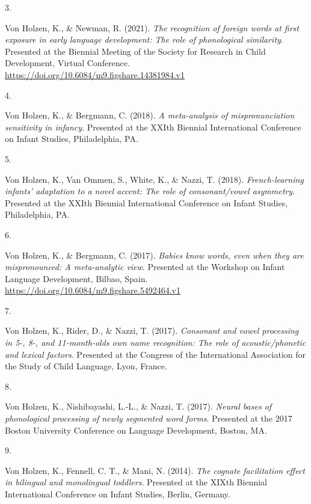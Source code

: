\documentclass[10pt,a4paper,]{article}
\newlength{\cslhangindent}
\newlength{\csllabelwidth}
\newcommand{\CSLLeftMargin}[1]{\parbox[t]{\csllabelwidth}{\hfill #1~}}
\newcommand{\CSLRightInline}[1]{\parbox[t]{\linewidth - \cslhangindent - \csllabelwidth}{#1}\vspace{0.8ex}}
\begin{document}
\leavevmode{}%
\CSLLeftMargin{3. }%
\CSLRightInline{Von Holzen, K., \& Newman, R. (2021). \emph{The
recognition of foreign words at first exposure in early language
development: The role of phonological similarity}. Presented at the
Biennial Meeting of the Society for Research in Child Development,
Virtual Conference.
\url{https://doi.org/10.6084/m9.figshare.14381984.v1}}

\leavevmode{}%
\CSLLeftMargin{4. }%
\CSLRightInline{Von Holzen, K., \& Bergmann, C. (2018). \emph{A
meta-analysis of mispronunciation sensitivity in infancy}. Presented at
the XXIth Biennial International Conference on Infant Studies,
Philadelphia, PA.}

\leavevmode{}%
\CSLLeftMargin{5. }%
\CSLRightInline{Von Holzen, K., Van Ommen, S., White, K., \& Nazzi, T.
(2018). \emph{French-learning infants' adaptation to a novel accent: The
role of consonant/vowel asymmetry}. Presented at the XXIth Biennial
International Conference on Infant Studies, Philadelphia, PA.}

\leavevmode{}%
\CSLLeftMargin{6. }%
\CSLRightInline{Von Holzen, K., \& Bergmann, C. (2017). \emph{Babies
know words, even when they are mispronounced: A meta-analytic view}.
Presented at the Workshop on Infant Language Development, Bilbao, Spain.
\url{https://doi.org/10.6084/m9.figshare.5492464.v1}}

\leavevmode{}%
\CSLLeftMargin{7. }%
\CSLRightInline{Von Holzen, K., Rider, D., \& Nazzi, T. (2017).
\emph{Consonant and vowel processing in 5-, 8-, and 11-month-olds own
name recognition: The role of acoustic/phonetic and lexical factors}.
Presented at the Congress of the International Association for the Study
of Child Language, Lyon, France.}

\leavevmode{}%
\CSLLeftMargin{8. }%
\CSLRightInline{Von Holzen, K., Nishibayashi, L.-L., \& Nazzi, T.
(2017). \emph{Neural bases of phonological processing of newly segmented
word forms}. Presented at the 2017 Boston University Conference on
Language Development, Boston, MA.}

\leavevmode{}%
\CSLLeftMargin{9. }%
\CSLRightInline{Von Holzen, K., Fennell, C. T., \& Mani, N. (2014).
\emph{The cognate facilitation effect in bilingual and monolingual
toddlers}. Presented at the XIXth Biennial International Conference on
Infant Studies, Berlin, Germany.}
\end{document}
